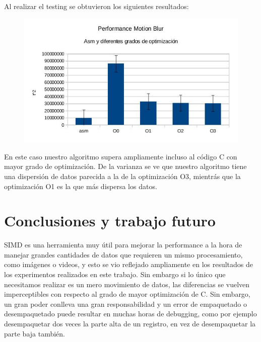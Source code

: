\documentclass[a4paper]{article}
\begin{document}
Al realizar el testing se obtuvieron los siguientes resultados:

\begin{figure}[h!]
  \begin{center}
  \includegraphics[scale=0.66]{Graficos1.4/mbl/per.jpg}
  \label{nombreparareferenciar11}
  \end{center}
\end{figure}

En este caso nuestro algoritmo supera ampliamente incluso al código C con mayor grado de optimización. De la varianza se ve que nuestro algoritmo tiene una dispersión de datos parecida a la de la optimización O3, mientrás que la optimización O1 es la que más dispersa los datos.

\newpage
\section{Conclusiones y trabajo futuro}

SIMD es una herramienta muy útil para mejorar la performance a la hora de manejar grandes cantidades de datos que requieren un mismo procesamiento, como imágenes o videos, y esto se vio reflejado ampliamente en los resultados de los experimentos realizados en este trabajo. Sin embargo si lo único que necesitamos realizar es un mero movimiento de datos, las diferencias se vuelven imperceptibles con respecto al grado de mayor optimización de C. Sin embargo, un gran poder conlleva una gran responsabilidad y un error de empaquetado o desempaquetado puede resultar en muchas horas de debugging, como por ejemplo desempaquetar dos veces la parte alta de un registro, en vez de desempaquetar la parte baja también.
\end{document}
